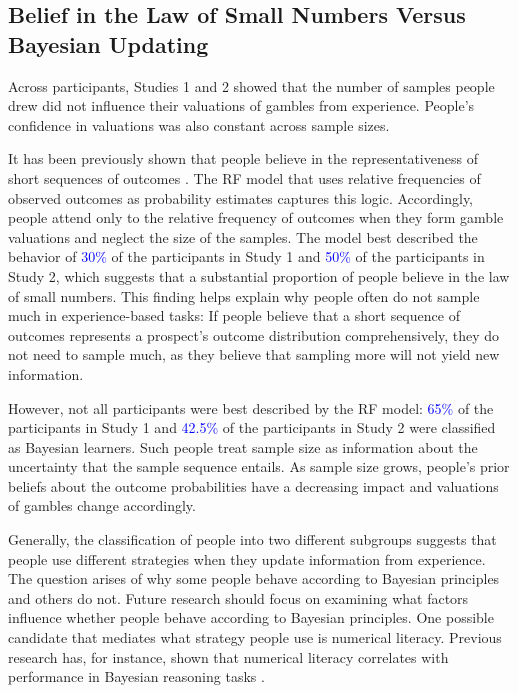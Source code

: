 \documentclass[a4paper, man, natbib, floatsintext]{apa6} %
\begin{document}
\subsection{Belief in the Law of Small Numbers Versus Bayesian Updating}
Across participants, Studies 1 and 2 showed that the number of samples people drew did not influence their valuations of gambles from experience. People's confidence in valuations was also constant across sample sizes. 

It has been previously shown that people believe in the representativeness of short sequences of outcomes \citep{Griffin1992, Tversky1971}. The RF model that uses relative frequencies of observed outcomes as probability estimates captures this logic. Accordingly, people attend  only to the relative frequency of outcomes when they form gamble valuations and neglect the size of the samples. The model best described the behavior of \textcolor{blue}{30\%} of the participants in Study 1 and \textcolor{blue}{50\%} of the participants in Study 2, which suggests that a substantial proportion of people believe in the law of small numbers. This finding helps explain why people often do not sample much in experience-based tasks: If people believe that a short sequence of outcomes represents a prospect's outcome distribution comprehensively, they do not need to sample much, as they believe that sampling more will not yield new information. 

However, not all participants were best described by the RF model: \textcolor{blue}{65\%}
of the participants in Study 1 and \textcolor{blue}{42.5\%} of the participants in Study 2 were classified as Bayesian learners. Such people treat sample size as information about the uncertainty that the sample sequence entails. As sample size grows, people's prior beliefs about the outcome probabilities have a decreasing impact and valuations of gambles change accordingly. 

Generally, the classification of people into two different subgroups suggests that people use different strategies when they update information from experience. 
The question arises of why some people behave according to Bayesian principles and others do not. Future research should focus on examining what factors influence whether people behave according to Bayesian principles. One possible candidate that mediates what strategy people use is numerical literacy. Previous research has, for instance, shown that numerical literacy correlates with performance in Bayesian reasoning tasks \citep{Brase2017}. 
\end{document}
